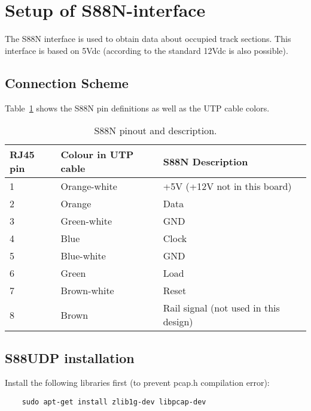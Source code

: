 \section{Setup of S88N-interface}
The S88N interface is used to obtain data about occupied track sections. This interface is based on 5Vdc (according to the standard 12Vdc is also possible).

\subsection{Connection Scheme}
Table~\ref*{tab:S88Npinning} shows the S88N pin definitions as well as the UTP cable colors.

\begin{table}[]
	\caption{S88N pinout and description.}
	\label{tab:S88Npinning}
	\begin{tabular}{|l|l|l|}
		\hline
		\rowcolor[HTML]{9B9B9B} 
		\textbf{RJ45 pin} & \textbf{Colour in UTP cable} & \textbf{S88N Description}             \\ \hline
		1                 & Orange-white                 & +5V (+12V not in this board)          \\ \hline
		2                 & Orange                       & Data                                  \\ \hline
		3                 & Green-white                  & GND                                   \\ \hline
		4                 & Blue                         & Clock                                 \\ \hline
		5                 & Blue-white                   & GND                                   \\ \hline
		6                 & Green                        & Load                                  \\ \hline
		7                 & Brown-white                  & Reset                                 \\ \hline
		8                 & Brown                        & Rail signal (not used in this design) \\ \hline
	\end{tabular}
\end{table}

\subsection{S88UDP installation}
Install the following libraries first (to prevent pcap.h compilation error):
\begin{verbatim}
	sudo apt-get install zlib1g-dev libpcap-dev	
\end{verbatim}


